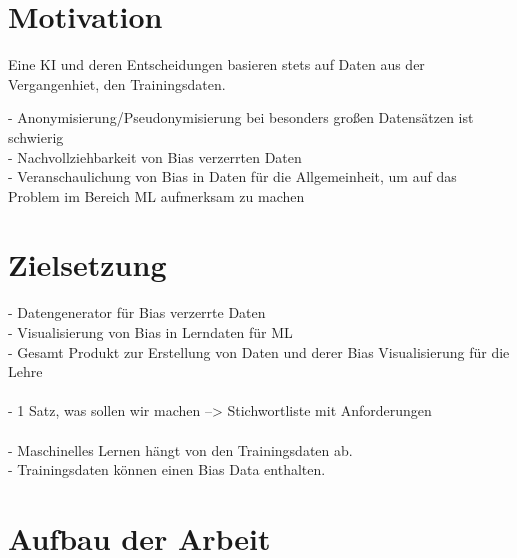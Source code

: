 \begin{onehalfspace}
        \newpage

        \section{Motivation}
        \label{subsec:motivation}
        Eine \ac*{KI} und deren Entscheidungen basieren stets auf Daten aus der Vergangenhiet, den Trainingsdaten. 

        -	Anonymisierung/Pseudonymisierung bei besonders gro{\ss}en Datensätzen ist schwierig \\
        -	Nachvollziehbarkeit von Bias verzerrten Daten \\
        -	Veranschaulichung von Bias in Daten für die Allgemeinheit, um auf das Problem im Bereich ML aufmerksam zu machen 

        \section{Zielsetzung}
        \label{subsec:zielsetzung}
        -	Datengenerator für Bias verzerrte Daten \\
        -	Visualisierung von Bias in Lerndaten für ML \\
        -	Gesamt Produkt zur Erstellung von Daten und derer Bias Visualisierung für die Lehre \\
        \\
        -   1 Satz, was sollen wir machen --> Stichwortliste mit Anforderungen \\
        \\
        -   Maschinelles Lernen hängt von den Trainingsdaten ab.\\
        -   Trainingsdaten können einen Bias Data enthalten.\\

        \section{Aufbau der Arbeit}
        \label{subsec:aufbau der arbeit}

        \newpage

    \end{onehalfspace}